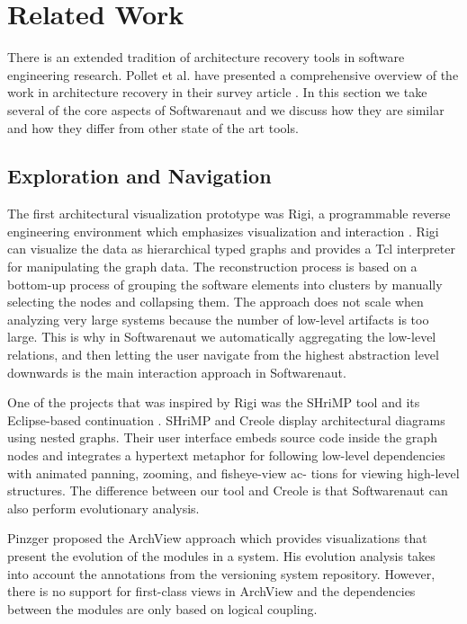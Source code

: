 \documentclass[preprint,12pt]{elsarticle}
\begin{document}
\newpage
\section {Related Work}
\label {sec:rel}

There is an extended tradition of architecture recovery tools in software engineering research. Pollet et al. have presented a comprehensive overview of the work in architecture recovery in their survey article \cite{pollet-sar}. In this section we take several of the core aspects of Softwarenaut and we discuss how they are similar and how they differ from other state of the art tools.

\subsection {Exploration and Navigation} 

The first architectural visualization prototype was Rigi, a programmable reverse engineering environment which emphasizes visualization and interaction \cite{muller-revengenv}. Rigi can visualize the data as hierarchical typed graphs and provides a Tcl interpreter for manipulating the graph data. The reconstruction process is based on a bottom-up process of grouping the software elements into clusters by manually selecting the nodes and collapsing them. The approach does not scale when analyzing very large systems because the number of low-level artifacts is too large. This is why in Softwarenaut we automatically aggregating the low-level relations, and then letting the user navigate from the highest abstraction level downwards is the main interaction approach in Softwarenaut. 

One of the projects that was inspired by Rigi was the SHriMP tool \cite{storey-shrimp} and its Eclipse-based continuation \cite{lintern-creole}. SHriMP and Creole display architectural diagrams using nested graphs. Their user interface embeds source code inside the graph nodes and integrates a hypertext metaphor for following low-level dependencies with animated panning, zooming, and fisheye-view ac- tions for viewing high-level structures.
The difference between our tool and Creole is that Softwarenaut can also perform evolutionary analysis.

Pinzger proposed the ArchView approach \cite{pinzger-thesis} which provides visualizations that present the evolution of the modules in a system. His evolution analysis takes into account the annotations from the versioning system repository. However, there is no support for first-class views in ArchView and the dependencies between the modules are only based on logical coupling. 
\end{document}
